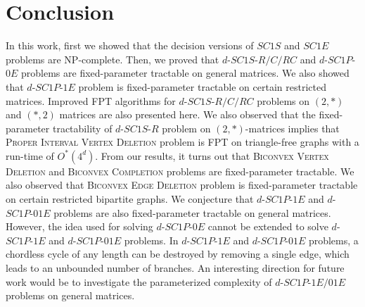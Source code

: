\documentclass[review, 1p]{elsarticle}
\begin{document}
\section{Conclusion}
In this work, first we showed that the decision versions of $SC1S$ and $SC1E$ problems are NP-complete. Then, we proved that $d$-$SC1S$-$R/C/RC$ and $d$-$SC1P$-$0E$ problems are fixed-parameter tractable on general matrices. We also showed that $d$-$SC1P$-$1E$ problem is fixed-parameter tractable on certain restricted matrices. Improved FPT algorithms for $d$-$SC1S$-$R/C/RC$ problems on $(2,*)$ and $(*,2)$ matrices are also presented here. We also observed that the fixed-parameter tractability of $d$-$SC1S$-$R$ problem on $(2,*)$-matrices implies that \textsc{Proper Interval Vertex Deletion} problem is FPT on triangle-free graphs with a run-time of $O^{*}(4^{d})$. From our results, it turns out that \textsc{Biconvex Vertex Deletion} and \textsc{Biconvex Completion} problems are fixed-parameter tractable. We also observed that \textsc{Biconvex Edge Deletion} problem is fixed-parameter tractable on certain restricted bipartite graphs. We conjecture that $d$-$SC1P$-$1E$ and $d$-$SC1P$-$01E$ problems are also fixed-parameter tractable on general matrices. However, the idea used for solving $d$-$SC1P$-$0E$ cannot be extended to solve $d$-$SC1P$-$1E$ and $d$-$SC1P$-$01E$ problems. In $d$-$SC1P$-$1E$ and $d$-$SC1P$-$01E$ problems, a chordless cycle of any length can be destroyed by removing a single edge, which leads to an unbounded number of branches. An interesting direction for future work would be to investigate the parameterized complexity of $d$-$SC1P$-$1E/01E$ problems on general matrices.
\label{references}


\end{document}
